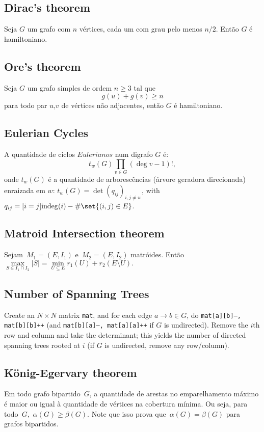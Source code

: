 \subsection{Dirac's theorem} Seja $G$ um grafo com $n$ vértices, cada um com grau pelo menos $n/2$. Então $G$ é hamiltoniano.

\subsection{Ore's theorem} Seja $G$ um grafo simples de ordem $n \geq 3$ tal que 
\[g(u) + g(v) \geq n \] para todo par $u$,$v$ de vértices não adjacentes, então $G$ é hamiltoniano.

\subsection{Eulerian Cycles}
A quantidade de ciclos $Eulerianos$ num digrafo $G$ é:\newline
		\begin{equation*}
			t_w(G) \prod_{v \in G} (\deg v - 1)!,
		\end{equation*}\newline
		onde $t_w(G)$ é a quantidade de arborescências (árvore geradora direcionada) enraizada em $w$: $t_w(G) = \det\left( q_{ij} \right)_{i,j \neq w}$, with $q_{ij} = [i=j] \mathrm{indeg}(i) - \# \set{(i,j) \in E}$.

\subsection{Matroid Intersection theorem}
Sejam~$M_1 = (E, I_1)$ e~$M_2 = (E, I_2)$ matróides. Então
$ \max\limits_{S \in I_1 \cap I_2}{|S|} = \min\limits_{U \subseteq E}{r_1(U) + r_2(E \setminus U)}.$

\subsection{Number of Spanning Trees}
		Create an $N\times N$ matrix \texttt{mat}, and for each edge $a \rightarrow b \in G$, do
		\texttt{mat[a][b]--, mat[b][b]++} (and \texttt{mat[b][a]--, mat[a][a]++} if $G$ is undirected).
		Remove the $i$th row and column and take the determinant; this yields the number of directed spanning trees rooted at $i$
		(if $G$ is undirected, remove any row/column).\newline

\subsection{König-Egervary theorem}
    Em todo grafo bipartido~$G$, a quantidade de arestas no emparelhamento máximo é maior ou igual à quantidade de vértices na cobertura mínima. Ou seja, para todo~$G$,~$\alpha(G) \geq \beta(G)$. Note que isso prova que~$\alpha(G) = \beta(G)$ para grafos bipartidos.


\


